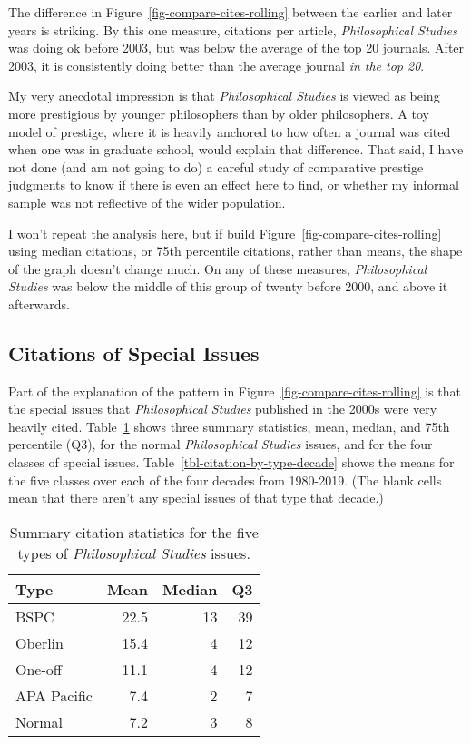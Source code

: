 \documentclass[
  10pt,
  letterpaper,
  DIV=11,
  numbers=noendperiod,
  twoside]{scrartcl}
\begin{document}
The difference in Figure~\ref{fig-compare-cites-rolling} between the
earlier and later years is striking. By this one measure, citations per
article, \emph{Philosophical Studies} was doing ok before 2003, but was
below the average of the top 20 journals. After 2003, it is consistently
doing better than the average journal \emph{in the top 20}.

My very anecdotal impression is that \emph{Philosophical Studies} is
viewed as being more prestigious by younger philosophers than by older
philosophers. A toy model of prestige, where it is heavily anchored to
how often a journal was cited when one was in graduate school, would
explain that difference. That said, I have not done (and am not going to
do) a careful study of comparative prestige judgments to know if there
is even an effect here to find, or whether my informal sample was not
reflective of the wider population.

I won't repeat the analysis here, but if build
Figure~\ref{fig-compare-cites-rolling} using median citations, or 75th
percentile citations, rather than means, the shape of the graph doesn't
change much. On any of these measures, \emph{Philosophical Studies} was
below the middle of this group of twenty before 2000, and above it
afterwards.

\subsection{Citations of Special
Issues}\label{sec-citations-of-special-issues}

Part of the explanation of the pattern in
Figure~\ref{fig-compare-cites-rolling} is that the special issues that
\emph{Philosophical Studies} published in the 2000s were very heavily
cited. Table~\ref{tbl-citation-by-type} shows three summary statistics,
mean, median, and 75th percentile (Q3), for the normal
\emph{Philosophical Studies} issues, and for the four classes of special
issues. Table~\ref{tbl-citation-by-type-decade} shows the means for the
five classes over each of the four decades from 1980-2019. (The blank
cells mean that there aren't any special issues of that type that
decade.)

\begin{longtable}[]{@{}lrrr@{}}

\caption{\label{tbl-citation-by-type}Summary citation statistics for the
five types of \emph{Philosophical Studies} issues.}

\tabularnewline

\toprule\noalign{}
Type & Mean & Median & Q3 \\
\midrule\noalign{}
\endhead
\bottomrule\noalign{}
\endlastfoot
BSPC & 22.5 & 13 & 39 \\
Oberlin & 15.4 & 4 & 12 \\
One-off & 11.1 & 4 & 12 \\
APA Pacific & 7.4 & 2 & 7 \\
Normal & 7.2 & 3 & 8 \\

\end{longtable}
\end{document}
